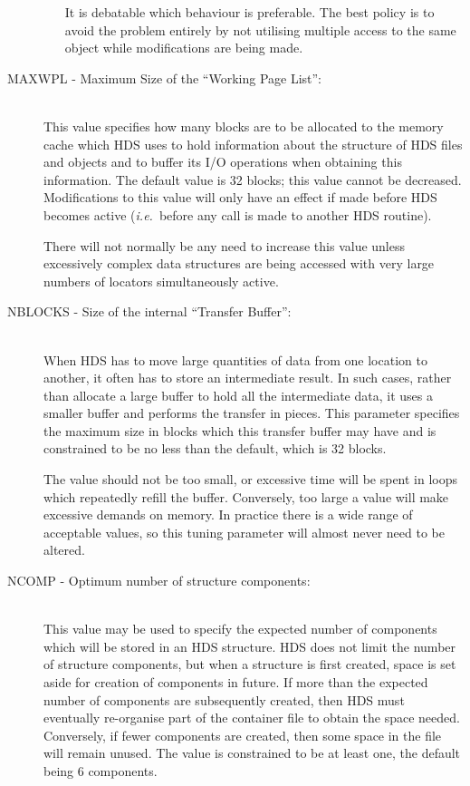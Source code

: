 \documentclass[twoside,11pt]{article}
\newcommand{\htmlref}[2]{#1}
\newcommand{\xlabel}[1]{}
\renewcommand{\_}{\texttt{\symbol{95}}}
\newcommand{\qt}[1]{``#1''}
\newcommand{\st}[1]{{\em{#1}}}
\newcommand{\htmltext}[1]{}
\newcommand{\qt}[1]{{\tt{"}}#1{\tt{"}}}
\newcommand{\htmltext}[1]{#1}
\begin{document}
\begin{description}
\begin{itemize}
It is debatable which behaviour is preferable. The best policy is to
avoid the problem entirely by not utilising multiple access to the
same object while modifications are being made.

\end{itemize}

\item [\xlabel{HDS_MAXWPL_tuning_parameter}MAXWPL - Maximum Size of the \qt{Working Page List}:]\mbox{}\\
This value specifies how many blocks\htmltext{\footnote{An HDS block
is 512 bytes.}}  are to be allocated to the memory cache which HDS
uses to hold information about the structure of HDS files and objects
and to buffer its I/O operations when obtaining this information. The
default value is 32 blocks; this value cannot be
decreased. Modifications to this value will only have an effect if
made before HDS becomes active (\st{i.e.}\ before any call is made to
another HDS routine).

There will not normally be any need to increase this value unless
excessively complex data structures are being accessed with very large
numbers of \htmlref{locators}{sect:locators} simultaneously active.

\item [\xlabel{HDS_NBLOCKS_tuning_parameter}NBLOCKS - Size of the internal \qt{Transfer Buffer}:]\mbox{}\\
When HDS has to move large quantities of data from one location to
another, it often has to store an intermediate result. In such cases,
rather than allocate a large buffer to hold all the intermediate data,
it uses a smaller buffer and performs the transfer in pieces. This
parameter specifies the maximum size in blocks\htmltext{\footnote{An
HDS block is 512 bytes.}} which this transfer buffer may have and is
constrained to be no less than the default, which is 32 blocks.

The value should not be too small, or excessive time will be spent in
loops which repeatedly refill the buffer. Conversely, too large a
value will make excessive demands on memory. In practice there is a
wide range of acceptable values, so this tuning parameter will almost
never need to be altered.

\item [\xlabel{HDS_NCOMP_tuning_parameter}NCOMP - Optimum number of structure components:]\mbox{}\\
This value may be used to specify the expected number of components
which will be stored in an HDS structure. HDS does not limit the
number of structure components, but when a structure is first created,
space is set aside for creation of components in future. If more than
the expected number of components are subsequently created, then HDS
must eventually re-organise part of the container file to obtain the
space needed. Conversely, if fewer components are created, then some
space in the file will remain unused. The value is constrained to be
at least one, the default being 6 components.


\end{description}
\end{document}
